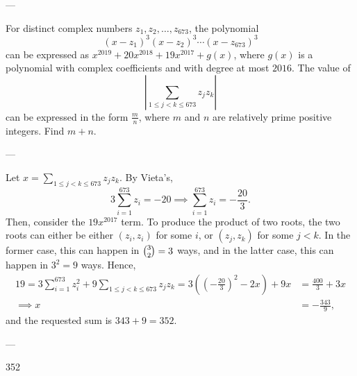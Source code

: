 
---

For distinct complex numbers $z_1,z_2,\ldots,z_{673}$, the polynomial \[(x-z_1)^3(x-z_2)^3\cdots(x-z_{673})^3\]
can be expressed as $x^{2019}+20x^{2018}+19x^{2017}+g(x)$, where $g(x)$ is a polynomial with complex coefficients and with degree at most $2016$. The value of \[\left|\sum_{1\le j<k\le 673}z_jz_k\right|\]
can be  expressed in the form $\tfrac mn$, where $m$ and $n$ are relatively prime positive integers. Find $m+n$.

---

Let $x=\sum_{1\le j<k\le 673} z_jz_k$. By Vieta's, \[3\sum_{i=1}^{673}z_i=-20\implies \sum_{i=1}^{673}z_i=-\frac{20}3.\]
Then, consider the $19x^{2017}$ term. To produce the product of two roots, the two roots can either be either $(z_i,z_i)$ for some $i$, or $(z_j,z_k)$ for some $j<k$. In the former case, this can happen in $\tbinom 32=3$ ways, and in the latter case, this can happen in $3^2=9$ ways. Hence,
\begin{align*}
    19=3\sum_{i=1}^{673} z_i^2+9\sum_{1\le j<k\le 673} z_jz_k=3\left(\left(-\frac{20}3\right)^2-2x\right)+9x&=\frac{400}3+3x\\
    \implies x&=-\frac{343}9,
\end{align*}
and the requested sum is $343+9=352$.

---

352
